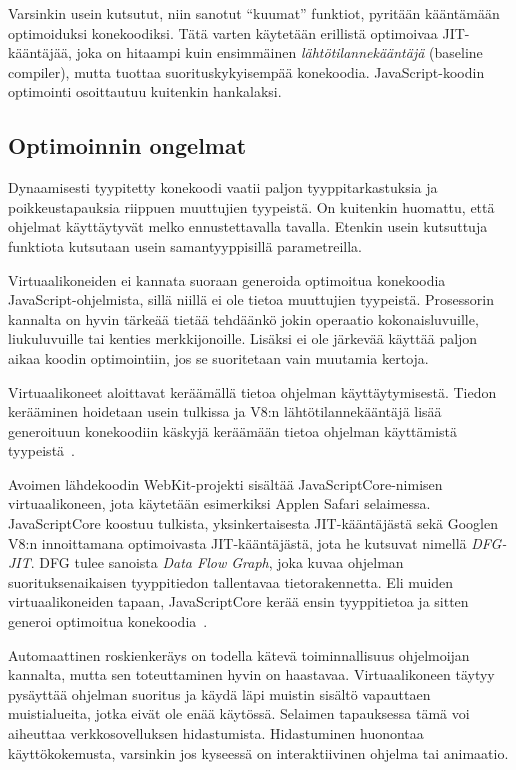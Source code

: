 Varsinkin usein kutsutut, niin sanotut ``kuumat'' funktiot, pyritään kääntämään optimoiduksi konekoodiksi. Tätä varten käytetään erillistä optimoivaa JIT-kääntäjää, joka on hitaampi kuin ensimmäinen \textit{lähtötilannekääntäjä} (baseline compiler), mutta tuottaa suorituskykyisempää konekoodia. JavaScript-koodin optimointi osoittautuu kuitenkin hankalaksi.

\subsection{Optimoinnin ongelmat}

Dynaamisesti tyypitetty konekoodi vaatii paljon tyyppitarkastuksia ja poikkeustapauksia riippuen muuttujien tyypeistä. On kuitenkin huomattu, että ohjelmat käyttäytyvät melko ennustettavalla tavalla. Etenkin usein kutsuttuja funktiota kutsutaan usein samantyyppisillä parametreilla.

Virtuaalikoneiden ei kannata suoraan generoida optimoitua konekoodia JavaScript-ohjelmista, sillä niillä ei ole tietoa muuttujien tyypeistä. Prosessorin kannalta on hyvin tärkeää tietää tehdäänkö jokin operaatio kokonaisluvuille, liukuluvuille tai kenties merkkijonoille. Lisäksi ei ole järkevää käyttää paljon aikaa koodin optimointiin, jos se suoritetaan vain muutamia kertoja.

Virtuaalikoneet aloittavat keräämällä tietoa ohjelman käyttäytymisestä. Tiedon kerääminen hoidetaan usein tulkissa ja V8:n lähtötilannekääntäjä lisää generoituun konekoodiin käskyjä keräämään tietoa ohjelman käyttämistä tyypeistä~\cite{v8compilers}.

Avoimen lähdekoodin WebKit-projekti sisältää JavaScriptCore-nimisen virtuaalikoneen, jota käytetään esimerkiksi Applen Safari selaimessa. JavaScriptCore koostuu tulkista, yksinkertaisesta JIT-kääntäjästä sekä Googlen V8:n innoittamana optimoivasta JIT-kääntäjästä, jota he kutsuvat nimellä \textit{DFG-JIT}. DFG tulee sanoista \textit{Data Flow Graph}, joka kuvaa ohjelman suorituksenaikaisen tyyppitiedon tallentavaa tietorakennetta. Eli muiden virtuaalikoneiden tapaan, JavaScriptCore kerää ensin tyyppitietoa ja sitten generoi optimoitua konekoodia~\cite{javascriptcore}.

Automaattinen roskienkeräys on todella kätevä toiminnallisuus ohjelmoijan kannalta, mutta sen toteuttaminen hyvin on haastavaa. Virtuaalikoneen täytyy pysäyttää ohjelman suoritus ja käydä läpi muistin sisältö vapauttaen muistialueita, jotka eivät ole enää käytössä. Selaimen tapauksessa tämä voi aiheuttaa verkkosovelluksen hidastumista. Hidastuminen huonontaa käyttökokemusta, varsinkin jos kyseessä on interaktiivinen ohjelma tai animaatio.

